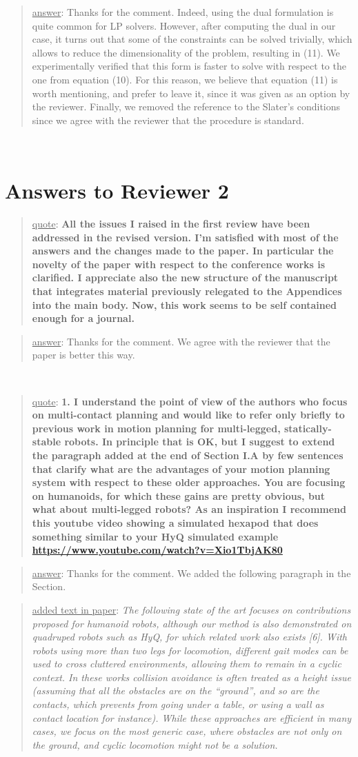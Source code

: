 \documentclass[a4paper]{article}
\newcommand\quot[1]{\begin{quote} \underline{quote}: \textbf{#1}\end{quote}}
\newcommand\as[1]{\begin{quote} \underline{answer}: {#1}\end{quote} }
\newcommand\qt[1]{\begin{quote} \underline{added text in paper}: \textit{#1}\end{quote} \leavevmode \\ }
\begin{document}
\as{Thanks for the comment. Indeed, using the dual formulation is quite common for LP solvers. However, after computing the dual in our case, it turns out that some of the constraints can be solved trivially, which allows to reduce the dimensionality of the problem, resulting in (11). We experimentally verified that this form is faster to solve with respect to the one from equation (10). For this reason, we believe that equation (11) is worth mentioning, and prefer to leave it, since it was given as an option by the reviewer. Finally, we removed the reference to the Slater's conditions since we agree with the reviewer that the procedure is standard.}

\leavevmode \\
\section{Answers to Reviewer 2}
\quot{All the issues I raised in the first review have been addressed in
the revised version. I'm satisfied with most of the answers and the
changes made to the paper. In particular the novelty of the paper with
respect to the conference works is clarified. I appreciate also the new
structure of the manuscript that integrates material previously
relegated to the Appendices into the main body. Now, this work seems to
be self contained enough for a journal. }
\as{Thanks for the comment. We agree with the reviewer that the paper is better this way.}

\leavevmode \\
\quot{
1. I understand the point of view of the authors who focus on
multi-contact planning and would like to refer only briefly to previous
work in motion planning for multi-legged, statically-stable robots. In
principle that is OK, but I suggest to extend the paragraph added at
the end of Section I.A by few sentences that clarify what are the
advantages of your motion planning system with respect to these older
approaches. You are focusing on humanoids, for which these gains are
pretty obvious, but what about multi-legged robots? As an inspiration I
recommend this youtube video showing a simulated hexapod that does
something similar to your HyQ simulated example
\url{https://www.youtube.com/watch?v=Xio1TbjAK80}}

\as{Thanks for the comment. We added the following paragraph in the Section.}
\qt{The following state of the art focuses on contributions proposed for humanoid robots, although our method is also demonstrated on quadruped robots such as HyQ, for which related work also exists [6]. With robots using more than two legs for locomotion, different gait modes can be used to cross cluttered environments, allowing them to remain in a cyclic context. In these works collision avoidance is often treated as a height issue (assuming that all the obstacles are on the ``ground'', and so are the contacts, which prevents from going under a table, or using a wall as contact location for instance). While these approaches are efficient in many cases, we focus on the most generic case, where obstacles are not only on the ground, and cyclic locomotion might not be a solution.}
\leavevmode \\
\end{document}
